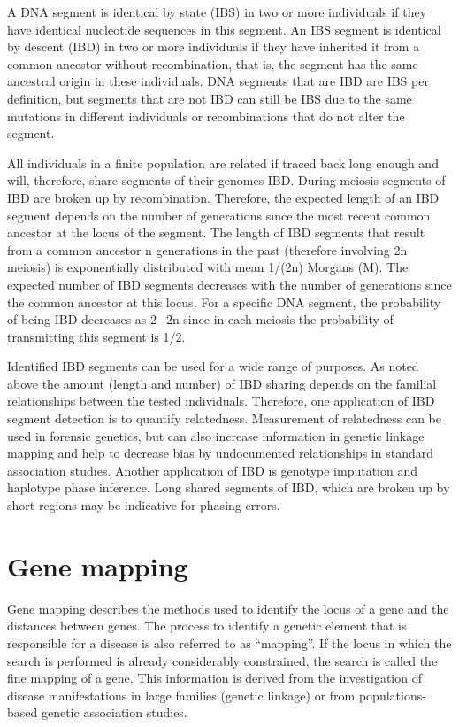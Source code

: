 A DNA segment is identical by state (IBS) in two or more individuals if they have identical nucleotide sequences in this segment. An IBS segment is identical by descent (IBD) in two or more individuals if they have inherited it from a common ancestor without recombination, that is, the segment has the same ancestral origin in these individuals. DNA segments that are IBD are IBS per definition, but segments that are not IBD can still be IBS due to the same mutations in different individuals or recombinations that do not alter the segment.

All individuals in a finite population are related if traced back long enough and will, therefore, share segments of their genomes IBD. During meiosis segments of IBD are broken up by recombination. Therefore, the expected length of an IBD segment depends on the number of generations since the most recent common ancestor at the locus of the segment. The length of IBD segments that result from a common ancestor n generations in the past (therefore involving 2n meiosis) is exponentially distributed with mean 1/(2n) Morgans (M). The expected number of IBD segments decreases with the number of generations since the common ancestor at this locus. For a specific DNA segment, the probability of being IBD decreases as 2−2n since in each meiosis the probability of transmitting this segment is 1/2.

Identified IBD segments can be used for a wide range of purposes. As noted above the amount (length and number) of IBD sharing depends on the familial relationships between the tested individuals. Therefore, one application of IBD segment detection is to quantify relatedness. Measurement of relatedness can be used in forensic genetics, but can also increase information in genetic linkage mapping and help to decrease bias by undocumented relationships in standard association studies. Another application of IBD is genotype imputation and haplotype phase inference. Long shared segments of IBD, which are broken up by short regions may be indicative for phasing errors.

\hypertarget{gene-mapping}{%
\section{Gene mapping}\label{gene-mapping}}

Gene mapping describes the methods used to identify the locus of a gene and the distances between genes. The process to identify a genetic element that is responsible for a disease is also referred to as ``mapping''. If the locus in which the search is performed is already considerably constrained, the search is called the fine mapping of a gene. This information is derived from the investigation of disease manifestations in large families (genetic linkage) or from populations-based genetic association studies.

